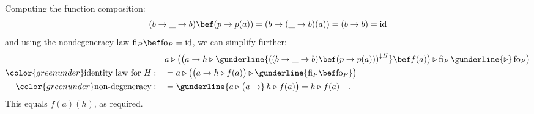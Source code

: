 Computing the function composition:
\[
(b\rightarrow\_\rightarrow b)\bef(p\rightarrow p(a))=(b\rightarrow(\_\rightarrow b)(a))=(b\rightarrow b)=\text{id}
\]
and using the nondegeneracy law $\text{fi}_{P}\bef\text{fo}_{P}=\text{id}$,
we can simplify further:
\begin{align*}
 & a\triangleright\big(\big(a\rightarrow h\triangleright\gunderline{\left((b\rightarrow\_\rightarrow b)\bef(p\rightarrow p(a))\right)^{\downarrow H}}\bef f(a)\big)\triangleright\text{fi}_{P}\,\gunderline{\triangleright}\,\text{fo}_{P}\big)\\
{\color{greenunder}\text{identity law for }H:}\quad & =a\triangleright\big(\big(a\rightarrow h\triangleright f(a)\big)\triangleright\gunderline{\text{fi}_{P}\bef\text{fo}_{P}}\big)\\
{\color{greenunder}\text{non-degeneracy}:}\quad & =\gunderline{a\triangleright\big(a\rightarrow}\,h\triangleright f(a)\big)=h\triangleright f(a)\quad.
\end{align*}
This equals $f(a)(h)$, as required.%
